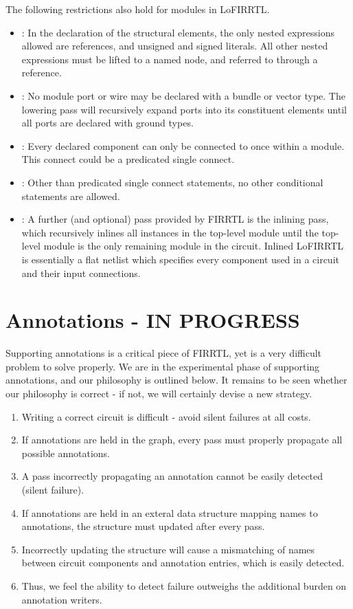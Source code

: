 \documentclass[12pt]{article}
\begin{document}
The following restrictions also hold for modules in LoFIRRTL.

\begin{itemize}
\item {} : 
In the declaration of the structural elements, the only nested expressions allowed are references, and unsigned and signed literals.
All other nested expressions must be lifted to a named node, and referred to through a reference. 
\item {} :
No module port or wire may be declared with a bundle or vector type.
The lowering pass will recursively expand ports into its constituent elements until all ports are declared with ground types.
\item {} :
Every declared component can only be connected to once within a module.
This connect could be a predicated single connect.
\item {} :
Other than predicated single connect statements, no other conditional statements are allowed.
\item {} :
A further (and optional) pass provided by FIRRTL is the inlining pass, which recursively inlines all instances in the top-level module until the top-level module is the only remaining module in the circuit.
Inlined LoFIRRTL is essentially a flat netlist which specifies every component used in a circuit and their input connections. 
\end{itemize}

\section{Annotations - IN PROGRESS}
Supporting annotations is a critical piece of FIRRTL, yet is a very difficult problem to solve properly.
We are in the experimental phase of supporting annotations, and our philosophy is outlined below.
It remains to be seen whether our philosophy is correct - if not, we will certainly devise a new strategy.

\begin{enumerate}[topsep=3pt,itemsep=-0.5ex,partopsep=1ex,parsep=1ex]
\item Writing a correct circuit is difficult - avoid silent failures at all costs.
\item If annotations are held in the graph, every pass must properly propagate all possible annotations.
\item A pass incorrectly propagating an annotation cannot be easily detected (silent failure).
\item If annotations are held in an exteral data structure mapping names to annotations, the structure must updated after every pass.
\item Incorrectly updating the structure will cause a mismatching of names between circuit components and annotation entries, which is easily detected.
\item Thus, we feel the ability to detect failure outweighs the additional burden on annotation writers.
\end{enumerate}
\end{document}
